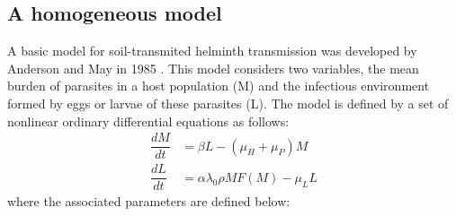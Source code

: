\documentclass[12pt,a4paper]{article}
\theoremstyle{plain}%
\theoremstyle{definition}
\theoremstyle{remark}
\begin{document}
	\subsection{A homogeneous model}
	A basic model for soil-transmited helminth transmission was developed by Anderson and May in 1985  \citep{anderson1992infectious}. This model considers two variables, the mean burden of parasites in a host population (M) and the infectious environment formed by eggs or larvae of these parasites (L). The model is defined by a set of nonlinear ordinary differential equations as follows:
	\begin{equation}\label{model1}
	\begin{split}
	\dfrac{dM}{dt}&=\beta L - (\mu_H+\mu_P) M\\
	\dfrac{dL}{dt}&= \alpha \lambda_0  \rho M F(M)  - \mu_L L 
	\end{split}
	\end{equation}
	where the associated parameters are defined below:
\end{document}

